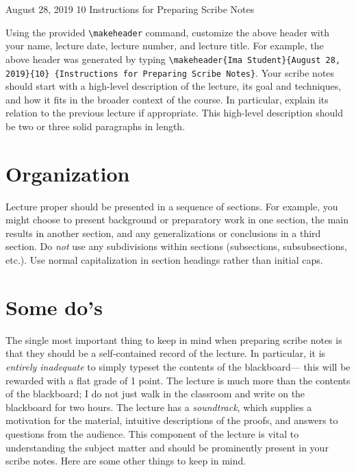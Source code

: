 \documentclass[usletter]{article}
\begin{document}
           {August 28, 2019}                          %
           {10}                                       %
           {Instructions for Preparing Scribe Notes}  %

\noindent
Using the provided \verb|\makeheader| command, 
customize the above header with your name,
lecture date, lecture number, and lecture title. For
example, the above header was generated by typing 
\verb|\makeheader{Ima Student}{August 28, 2019}{10}|{\tt 
\{Instructions for Preparing Scribe Notes\}}.  Your
scribe notes should start with a high-level description
of the lecture, its goal and techniques, and how it
fits in the broader context of the course. In
particular, explain its relation to the previous
lecture if appropriate.  This high-level description
should be two or three solid paragraphs in length.

\section{Organization}
Lecture proper should be presented in a sequence of
sections. For example, you might choose to present
background or preparatory work in one section, the main results in
another section, and any generalizations or conclusions
in a third section. Do \emph{not} use any subdivisions
within sections (subsections, subsubsections, etc.).
Use normal capitalization in section headings rather
than initial caps.

\section{Some do's}
The single most important thing to keep in mind when
preparing scribe notes is that they should be a
self-contained record of the lecture.  In
particular, it is {\em entirely inadequate} to simply typeset
the contents of the blackboard--- this will
be rewarded with a flat grade of 1 point.  The lecture
is much more than the contents of the
blackboard; I do not just walk in the classroom and
write on the blackboard for two hours. The lecture has
a \emph{soundtrack}, which supplies a motivation for
the material, intuitive descriptions of the proofs, and
answers to questions from the audience.  This component
of the lecture is vital to understanding the subject
matter and should be prominently present in your scribe
notes.  Here are some other things to keep in mind.
\end{document}
